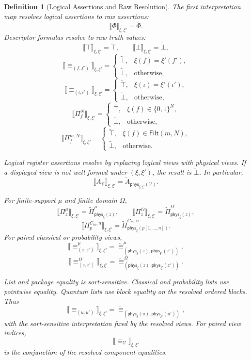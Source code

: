 \documentclass[acmsmall,screen,review,anonymous,nonacm]{acmart}
\newtheorem{definition}{Definition}[section]
\theoremstyle{defn_style}
\begin{document}
\begin{definition}[Logical Assertions and Raw Resolution]
The first interpretation map resolves logical assertions to raw assertions:
\[
\llbracket \Phi\rrbracket_{\xi,\xi'}=\widetilde{\Phi}.
\]
Descriptor formulas resolve to raw truth values:
\[
\llbracket \top\rrbracket_{\xi,\xi'}=\widetilde{\top},
\qquad
\llbracket \bot\rrbracket_{\xi,\xi'}=\widetilde{\bot},
\]
\[
\llbracket \equiv_{(f,f')}\rrbracket_{\xi,\xi'}
=
\begin{cases}
\widetilde{\top}, & \xi(f)=\xi'(f'),\\
\widetilde{\bot}, & \text{otherwise},
\end{cases}
\]
\[
\llbracket \equiv_{(\iota,\iota')}\rrbracket_{\xi,\xi'}
=
\begin{cases}
\widetilde{\top}, & \xi(\iota)=\xi'(\iota'),\\
\widetilde{\bot}, & \text{otherwise},
\end{cases}
\]
\[
\llbracket \Pi_f^N\rrbracket_{\xi,\xi'}
=
\begin{cases}
\widetilde{\top}, & \xi(f)\in\{0,1\}^N,\\
\widetilde{\bot}, & \text{otherwise},
\end{cases}
\]
\[
\llbracket \Pi_f^{m,N}\rrbracket_{\xi,\xi'}
=
\begin{cases}
\widetilde{\top}, & \xi(f)\in\mathsf{Filt}(m,N),\\
\widetilde{\bot}, & \text{otherwise}.
\end{cases}
\]

Logical register assertions resolve by replacing logical views with physical
views. If a displayed view is not well formed under \((\xi,\xi')\), the result
is \(\widetilde{\bot}\). In particular,
\[
\llbracket A_{\mathcal V}\rrbracket_{\xi,\xi'}
=
\widetilde A_{\mathsf{phys}_{\xi,\xi'}(\mathcal V)}.
\]

For finite-support \(\mu\) and finite domain \(\Omega\),
\[
\llbracket \Pi_z^\mu\rrbracket_{\xi,\xi'}
=
\widetilde{\Pi}_{\mathsf{phys}_{\xi}(z)}^\mu,
\qquad
\llbracket \Pi_z^\Omega\rrbracket_{\xi,\xi'}
=
\widetilde{\Pi}_{\mathsf{phys}_{\xi}(z)}^\Omega,
\]
\[
\llbracket \Pi_p^{C_m,n}\rrbracket_{\xi,\xi'}
=
\widetilde{\Pi}_{\mathsf{phys}_{\xi}(p[1,\ldots,n])}^{C_m,n}.
\]
For paired classical or probability views,
\[
\llbracket \equiv_{(z,z')}^\mu\rrbracket_{\xi,\xi'}
=
\widetilde{\equiv}_{(\mathsf{phys}_{\xi}(z),\mathsf{phys}_{\xi'}(z'))}^{\mu},
\]
\[
\llbracket \equiv_{(z,z')}^\Omega\rrbracket_{\xi,\xi'}
=
\widetilde{\equiv}_{(\mathsf{phys}_{\xi}(z),\mathsf{phys}_{\xi'}(z'))}^{\Omega}.
\]

List and package equality is sort-sensitive. Classical and probability lists
use pointwise equality. Quantum lists use block equality on the resolved ordered
blocks. Thus
\[
\llbracket \equiv_{(u,u')}\rrbracket_{\xi,\xi'}
=
\widetilde{\equiv}_{(\mathsf{phys}_{\xi}(u),\mathsf{phys}_{\xi'}(u'))},
\]
with the sort-sensitive interpretation fixed by the resolved views. For paired
view indices,
\[
\llbracket\equiv_{\mathcal V}\rrbracket_{\xi,\xi'}
\]
is the conjunction of the resolved component equalities.


\end{definition}
\end{document}

